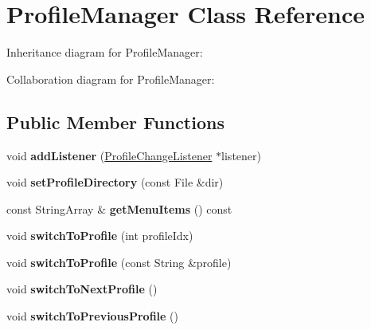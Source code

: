 \hypertarget{class_profile_manager}{}\section{Profile\+Manager Class Reference}
\label{class_profile_manager}


Inheritance diagram for Profile\+Manager\+:


Collaboration diagram for Profile\+Manager\+:
\subsection*{Public Member Functions}
\begin{DoxyCompactItemize}
\item 
void {\bfseries add\+Listener} (\hyperlink{class_profile_change_listener}{Profile\+Change\+Listener} $\ast$listener)\hypertarget{class_profile_manager_ab10b542da25d23277371cd2103316098}{}\label{class_profile_manager_ab10b542da25d23277371cd2103316098}

\item 
void {\bfseries set\+Profile\+Directory} (const File \&dir)\hypertarget{class_profile_manager_a1529c4a30042187372c455729d917cd5}{}\label{class_profile_manager_a1529c4a30042187372c455729d917cd5}

\item 
const String\+Array \& {\bfseries get\+Menu\+Items} () const \hypertarget{class_profile_manager_a29c905a98315b3f30ec72d542d68fd28}{}\label{class_profile_manager_a29c905a98315b3f30ec72d542d68fd28}

\item 
void {\bfseries switch\+To\+Profile} (int profile\+Idx)\hypertarget{class_profile_manager_a2744c8c215043462fa1805eb489d0232}{}\label{class_profile_manager_a2744c8c215043462fa1805eb489d0232}

\item 
void {\bfseries switch\+To\+Profile} (const String \&profile)\hypertarget{class_profile_manager_a9014037000e5a643c080e42f0c0e250e}{}\label{class_profile_manager_a9014037000e5a643c080e42f0c0e250e}

\item 
void {\bfseries switch\+To\+Next\+Profile} ()\hypertarget{class_profile_manager_a7644e0703d1bdb3172271cec13e86662}{}\label{class_profile_manager_a7644e0703d1bdb3172271cec13e86662}

\item 
void {\bfseries switch\+To\+Previous\+Profile} ()\hypertarget{class_profile_manager_a778eb208053cbcb18a7056b4066632ec}{}\label{class_profile_manager_a778eb208053cbcb18a7056b4066632ec}


\end{DoxyCompactItemize}
